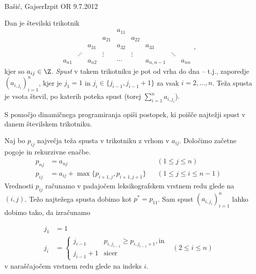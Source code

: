 \begin{naloga}{Bašić, Gajser}{Izpit OR 9.7.2012}
\begin{vprasanje}
Dan je številski trikotnik
$$
\begin{array}{ccccccccc}
                &&&& a_{11} \\
            &&& a_{21} && a_{22} \\
        && a_{31} && a_{32} && a_{33} \\
     & \iddots && \vdots && \vdots && \ddots \\
a_{n1} && a_{n2} && \cdots && a_{n,n-1} && a_{nn}
\end{array} ,
$$
kjer so $a_{ij} \in \Z$.
{\em Spust} v takem trikotniku je pot od vrha do dna
-- t.j., zaporedje $(a_{i, j_i})_{i=1}^n$,
kjer je $j_1 = 1$ in $j_i \in \{j_{i-1}, j_{i-1}+1\}$
za vsak $i = 2, \dots, n$.
Teža spusta je vsota števil, po katerih poteka spust
(torej $\sum_{i=1}^n a_{i, j_i}$).

S pomočjo dinamičnega programiranja opiši postopek,
ki poišče najtežji spust v danem številskem trikotniku.
\end{vprasanje}

\begin{odgovor}
Naj bo $p_{ij}$ največja teža spusta v trikotniku z vrhom v $a_{ij}$.
Določimo začetne pogoje in rekurzivne enačbe.
\begin{align*}
p_{nj} &= a_{nj} && (1 \le j \le n) \\
p_{ij} &= a_{ij} + \max\{p_{i+1,j}, p_{i+1,j+1}\} && (1 \le j \le i \le n-1)
\end{align*}
Vrednosti $p_{ij}$ računamo
v padajočem leksikografskem vrstnem redu glede na $(i, j)$.
Težo najtežega spusta dobimo kot $p^* = p_{11}$.
Sam spust $(a_{i, j_i})_{i=1}^n$ lahko dobimo tako,
da izračunamo

\begin{align*}
j_1 &= 1 \\
j_i &= \begin{cases}
j_{i-1} & p_{i,j_{i-1}} \ge p_{i,j_{i-1}+1}, \text{in} \\
j_{i-1} + 1 & \text{sicer}
\end{cases}
& (2 \le i \le n)
\end{align*}
v naraščajočem vrstnem redu glede na indeks $i$.
\end{odgovor}
\end{naloga}
